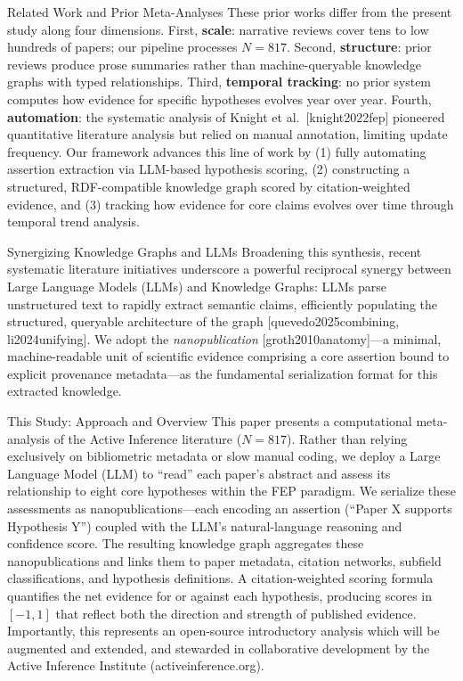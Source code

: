 \documentclass[
  ignorenonframetext,
]{beamer}
\providecommand{\citep}[1]{[#1]}
\begin{document}
\begin{frame}{Related Work and Prior
Meta-Analyses}
These prior works differ from the present study along four dimensions.
First, \textbf{scale}: narrative reviews cover tens to low hundreds of
papers; our pipeline processes \(N = 817\). Second, \textbf{structure}:
prior reviews produce prose summaries rather than machine-queryable
knowledge graphs with typed relationships. Third, \textbf{temporal
tracking}: no prior system computes how evidence for specific hypotheses
evolves year over year. Fourth, \textbf{automation}: the systematic
analysis of Knight et al.~\citep{knight2022fep} pioneered quantitative
literature analysis but relied on manual annotation, limiting update
frequency. Our framework advances this line of work by (1) fully
automating assertion extraction via LLM-based hypothesis scoring, (2)
constructing a structured, RDF-compatible knowledge graph scored by
citation-weighted evidence, and (3) tracking how evidence for core
claims evolves over time through temporal trend analysis.
\end{frame}

\begin{frame}[allowframebreaks]{Synergizing Knowledge Graphs and LLMs}
\protect{}\label{synergizing-knowledge-graphs-and-llms}
Broadening this synthesis, recent systematic literature initiatives
underscore a powerful reciprocal synergy between Large Language Models
(LLMs) and Knowledge Graphs: LLMs parse unstructured text to rapidly
extract semantic claims, efficiently populating the structured,
queryable architecture of the graph
\citep{quevedo2025combining, li2024unifying}. We adopt the
\emph{nanopublication} \citep{groth2010anatomy}---a minimal,
machine-readable unit of scientific evidence comprising a core assertion
bound to explicit provenance metadata---as the fundamental serialization
format for this extracted knowledge.
\end{frame}

\begin{frame}[allowframebreaks]{This Study: Approach and Overview}
\protect{}\label{this-study-approach-and-overview}
This paper presents a computational meta-analysis of the Active
Inference literature (\(N = 817\)). Rather than relying exclusively on
bibliometric metadata or slow manual coding, we deploy a Large Language
Model (LLM) to ``read'' each paper's abstract and assess its
relationship to eight core hypotheses within the FEP paradigm. We
serialize these assessments as nanopublications---each encoding an
assertion (``Paper X supports Hypothesis Y'') coupled with the LLM's
natural-language reasoning and confidence score. The resulting knowledge
graph aggregates these nanopublications and links them to paper
metadata, citation networks, subfield classifications, and hypothesis
definitions. A citation-weighted scoring formula quantifies the net
evidence for or against each hypothesis, producing scores in \([-1, 1]\)
that reflect both the direction and strength of published evidence.
Importantly, this represents an open-source introductory analysis which
will be augmented and extended, and stewarded in collaborative
development by the Active Inference Institute (activeinference.org).
\end{frame}
\end{document}
